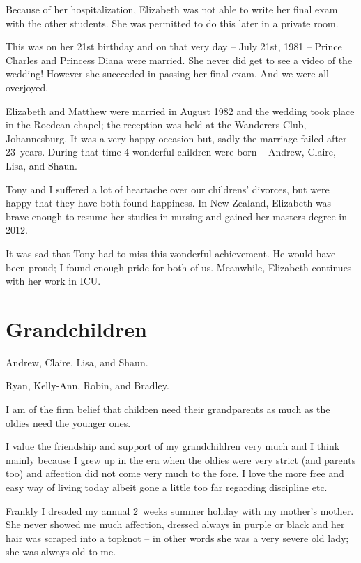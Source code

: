 Because of her hospitalization, Elizabeth was not able to write her
final exam with the other students. She was permitted to do this later
in a private room.

This was on her 21st birthday and on that very day -- July 21st, 1981
-- Prince Charles and Princess Diana were married. She never did get
to see a video of the wedding! However she succeeded in passing her
final exam. And we were all overjoyed.

Elizabeth and Matthew were married in August 1982 and the wedding took
place in the Roedean chapel; the reception was held at the Wanderers
Club, Johannesburg. It was a very happy occasion but, sadly the
marriage failed after 23~years. During that time 4 wonderful children
were born -- Andrew, Claire, Lisa, and Shaun.

Tony and I suffered a lot of heartache over our childrens' divorces,
but were happy that they have both found happiness. In New Zealand,
Elizabeth was brave enough to resume her studies in nursing and gained
her masters degree in 2012.

It was sad that Tony had to miss this wonderful achievement. He would
have been proud; I found enough pride for both of us. Meanwhile,
Elizabeth continues with her work in ICU.

\clearpage
\thispagestyle{empty}


\chapter{Grandchildren}

Andrew, Claire, Lisa, and Shaun.

Ryan, Kelly-Ann, Robin, and Bradley.

I am of the firm belief that children need their grandparents as much
as the oldies need the younger ones.

I value the friendship and support of my grandchildren very much and I
think mainly because I grew up in the era when the oldies were very
strict (and parents too) and affection did not come very much to the
fore. I love the more free and easy way of living today albeit gone a
little too far regarding discipline etc.

Frankly I dreaded my annual 2~weeks summer holiday with my mother's
mother. She never showed me much affection, dressed always in purple
or black and her hair was scraped into a topknot -- in other words she
was a very severe old lady; she was always old to me.

